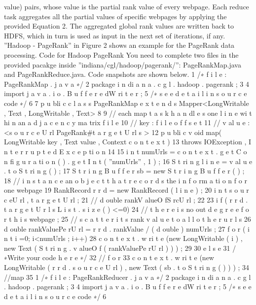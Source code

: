 value) pairs, whose value is the partial rank value of every webpage. Each reduce task aggregates all the
partial values of specific webpages by applying the provided Equation 2. The aggregated global rank values
are written back to HDFS, which in turn is used as input in the next set of iterations, if any. ”Hadoop -
PageRank” in Figure 2 shows an example for the PageRank data processing.
Code for Hadoop PageRank
You need to complete two files in the provided pacakge inside ”indiana/cgl/hadoop/pagerank/”: PageRankMap.java
and PageRankReduce.java. Code snapshots are shown below.
1 /∗ f i l e : PageRankMap . j a v a ∗/
2 package i n di a n a . c g l . hadoop . pagerank ;
3
4 import j a v a . i o . B u f f e r e dW ri t e r ;
5 /∗ s e e d e t a i l i n s o u r c e code ∗/
6
7 p u bli c c l a s s PageRankMap e x t e n d s Mapper<LongWritable , Text , LongWritable , Text> {
8
9 // each map t a s k h a n dl e s one l i n e wi t hi n an a d j a c e n c y ma trix f i l e
10 // key : f i l e o f f s e t
11 // v al u e : <s o u r c e U rl PageRank#t a r g e t U rl s >
12 p u bli c v oid map( LongWritable key , Text value , Context c o n t e x t )
13 throws IOException , I n t e r r u p t e d E x c e p ti o n {
14
15 i n t numUrls = c o n t e x t . g e t C o n fi g u r a ti o n ( ) . g e t I n t ( ”numUrls” , 1 ) ;
16 S t ri n g l i n e = v al u e . t o S t ri n g ( ) ;
17 S t r i n g B u f f e r sb = new S t r i n g B u f f e r ( ) ;
18 // i n s t a n c e an o b j e c t t h a t r e c o r d s the i n f o rm a ti o n f o r one webpage
19 RankRecord r r d = new RankRecord ( l i n e ) ;
20 i n t s o u r c eU rl , t a r g e t U rl ;
21 // d ouble rankV alueO fS rcU rl ;
22
23 i f ( r r d . t a r g e t U r l s L i s t . s i z e ( ) <=0){
24 // t h e r e i s no out d e g r e e f o r t h i s webpage ;
25 // s c a t t e r i t s rank v al u e t o a l l o t h e r u r l s
26 d ouble rankValuePe rU rl = r r d . rankValue / ( d ouble ) numUrls ;
27 f o r ( i n t i =0; i<numUrls ; i++){
28 c o n t e x t . w ri t e (new LongWritable ( i ) , new Text ( S t ri n g . v alueO f ( rankValuePe rU rl ) ) ) ;
29 }
30 } e l s e {
31 /∗Write your code h e r e ∗/
32 } // f o r
33 c o n t e x t . w ri t e (new LongWritable ( r r d . s o u r c e U rl ) , new Text ( sb . t o S t ri n g ( ) ) ) ;
34 }//map
35 }
1 /∗ f i l e : PageRankReducer . j a v a ∗/
2 package i n di a n a . c g l . hadoop . pagerank ;
3
4 import j a v a . i o . B u f f e r e dW ri t e r ;
5 /∗ s e e d e t a i l i n s o u r c e code ∗/
6

